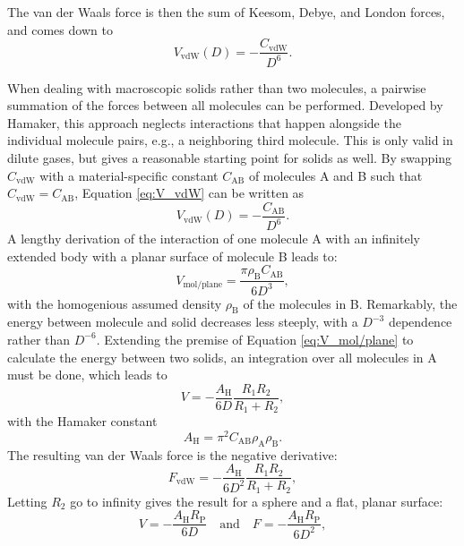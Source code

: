 The van der Waals force is then the sum of Keesom, Debye, and London forces, and comes down to 
\begin{equation}\label{eq:V_vdW}
    V_\mathrm{vdW}(D) = -\frac{C_\mathrm{vdW}}{D^6}.
\end{equation}

When dealing with macroscopic solids rather than two molecules, a pairwise summation of the forces between all molecules can be performed.
Developed by Hamaker, this approach neglects interactions that happen alongside the individual molecule pairs, e.g., a neighboring third molecule.  
This is only valid in dilute gases, but gives a reasonable starting point for solids as well\cite{Butt2018}.
By swapping $C_\mathrm{vdW}$ with a material-specific constant $C_\mathrm{AB}$ of molecules A and B such that $C_\mathrm{vdW} = C_\mathrm{AB}$, Equation \ref{eq:V_vdW} can be written as
\begin{equation}
        V_\mathrm{vdW}(D) = -\frac{C_\mathrm{AB}}{D^6}.
\end{equation}
A lengthy derivation of the interaction of one molecule A with an infinitely extended body with a planar surface of molecule B \cite{Butt2018} leads to:
\begin{equation}\label{eq:V_mol/plane}
    V_\mathrm{mol/plane} = \frac{\pi \rho_\mathrm{B}C_\mathrm{AB}}{6D^3},
\end{equation}
with the homogenious assumed density $\rho_\mathrm{B}$ of the molecules in B. 
Remarkably, the energy between molecule and solid decreases less steeply, with a $D^{-3}$ dependence rather than $D^{-6}$. 
Extending the premise of Equation \ref{eq:V_mol/plane} to calculate the energy between two solids, an integration over all molecules in A must be done, which leads to  
\begin{equation}
    V = -\frac{A_\mathrm{H}}{6D}\frac{R_1 R_2}{R_1 + R_2},
\end{equation}
with the Hamaker constant 
\begin{equation}
    A_\mathrm{H} = \pi^2C_\mathrm{AB}\rho_\mathrm{A}\rho_\mathrm{B}. 
\end{equation}
The resulting van der Waals force is the negative derivative:
\begin{equation}
    F_\mathrm{vdW} = -\frac{A_\mathrm{H}}{6D^2}\frac{R_1 R_2}{R_1 + R_2}, 
\end{equation}
Letting $R_2$ go to infinity gives the result for a sphere and a flat, planar surface:
\begin{equation}
        V = -\frac{A_\mathrm{H}R_\mathrm{P}}{6D} \quad \mathrm{and} \quad F =  -\frac{A_\mathrm{H}R_\mathrm{P}}{6D^2},
\end{equation}
